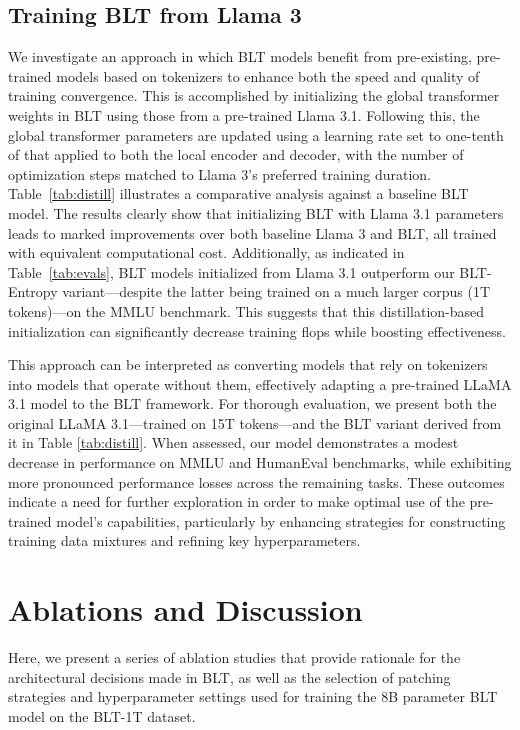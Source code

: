 \subsection{Training {\textsc BLT} from Llama 3}
\label{sec:distillation}
We investigate an approach in which {\textsc BLT} models benefit from pre-existing, pre-trained models based on tokenizers to enhance both the speed and quality of training convergence. This is accomplished by initializing the global transformer weights in {\textsc BLT} using those from a pre-trained Llama 3.1. Following this, the global transformer parameters are updated using a learning rate set to one-tenth of that applied to both the local encoder and decoder, with the number of optimization steps matched to Llama 3’s preferred training duration. Table~\ref{tab:distill} illustrates a comparative analysis against a baseline {\textsc BLT} model. The results clearly show that initializing {\textsc BLT} with Llama 3.1 parameters leads to marked improvements over both baseline Llama 3 and {\textsc BLT}, all trained with equivalent computational cost. Additionally, as indicated in Table~\ref{tab:evals}, {\textsc BLT} models initialized from Llama 3.1 outperform our {\textsc BLT}-Entropy variant—despite the latter being trained on a much larger corpus (1T tokens)—on the MMLU benchmark. This suggests that this distillation-based initialization can significantly decrease training flops while boosting effectiveness.

This approach can be interpreted as converting models that rely on tokenizers into models that operate without them, effectively adapting a pre-trained LLaMA 3.1 model to the {\textsc BLT} framework. For thorough evaluation, we present both the original LLaMA 3.1—trained on 15T tokens—and the {\textsc BLT} variant derived from it in Table \ref{tab:distill}. When assessed, our model demonstrates a modest decrease in performance on MMLU and HumanEval benchmarks, while exhibiting more pronounced performance losses across the remaining tasks. These outcomes indicate a need for further exploration in order to make optimal use of the pre-trained model’s capabilities, particularly by enhancing strategies for constructing training data mixtures and refining key hyperparameters.

\section{Ablations and Discussion}
\label{section:ablations}
Here, we present a series of ablation studies that provide rationale for the architectural decisions made in {\textsc BLT}, as well as the selection of patching strategies and hyperparameter settings used for training the 8B parameter {\textsc BLT} model on the {\textsc BLT}-1T dataset.

